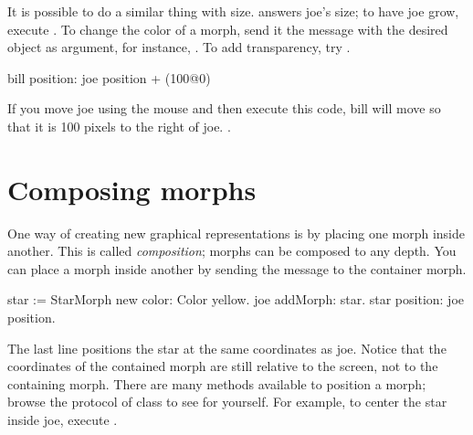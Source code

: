 \documentclass[a4paper,10pt,twoside]{book}
\begin{document}
It is possible to do a similar thing with size.
  answers joe's size; to have joe grow, execute .
To change the color of a morph, send it the  message with the desired  object as argument, for instance, .
To add transparency, try .

\begin{code}{}
bill position: joe position + (100@0)
\end{code}
\noindent
If you move joe using the mouse and then execute this code, bill will move so that it is 100 pixels to the right of joe.
.

\section{Composing morphs}

One way of creating new graphical representations is by placing one morph inside another.
This is called \emph{composition}; morphs can be composed to any depth.
%
You can place a morph inside another by sending the message  to the container morph.

\begin{code}{}
star := StarMorph new color: Color yellow.
joe addMorph: star.
star position: joe position.
\end{code}

\noindent
The last line positions the star at the same coordinates as joe.
Notice that the coordinates of the contained morph are still relative to the screen, not to the containing morph.
There are many  methods available to position a morph; browse the  protocol of class  to see for yourself.
For example, to center the star inside joe, execute   .
\end{document}
